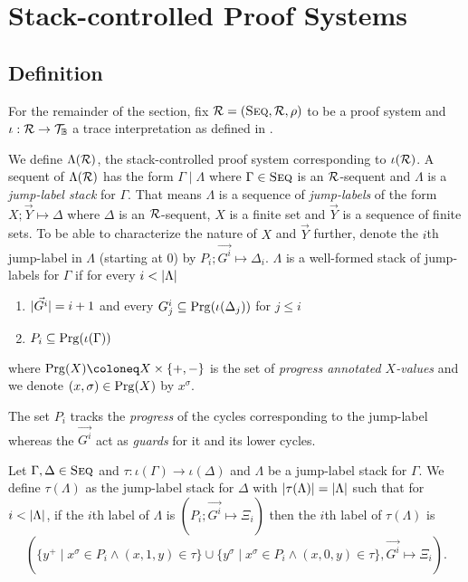 
\chapter{Stack-controlled Proof Systems}
\label{chap:stacks}

\section{Definition}
\label{sec:define-stacks}

For the remainder of the section, fix $\mathcal{R} = (\textsc{Seq}, \mathcal{R}, \rho)$ to be a proof
system and $\iota : \mathcal{R} \to \mathcal{T}_{\mathbb{B}}$ a trace interpretation as defined in
.

We define $\Lambda(\mathcal{R})$, the stack-controlled proof system corresponding to
$\iota(\mathcal{R})$. A sequent of $\Lambda(\mathcal{R})$ has the form $\Gamma \mid \Lambda$
where $\Gamma \in \textsc{Seq}$ is an $\mathcal{R}$-sequent and $\Lambda$ is a \emph{jump-label
  stack} for $\Gamma$. That means $\Lambda$ is a sequence of
\emph{jump-labels} of the form $X ; \vec{Y} \mapsto \Delta$ where $\Delta$ is an
$\mathcal{R}$-sequent, $X$ is a finite set and $\vec{Y}$ is a sequence of finite sets.
To be able to characterize the nature of $X$ and $\vec{Y}$ further, denote the
$i$th jump-label in $\Lambda$ (starting at $0$) by $P_i; \vec{G^i} \mapsto
\Delta_i$. $\Lambda$ is a well-formed stack of jump-labels for $\Gamma$ if for
every $i < |\Lambda|$
\begin{enumerate}[label=(\roman*)]
\item $|\vec{G^i}| = i + 1$ and every $G^i_j \subseteq
  \mathrm{Prg}(\iota(\Delta_j))$ for $j \leq i$
\item $P_i \subseteq \mathrm{Prg}(\iota(\Gamma))$
\end{enumerate}
where $\prg(X) \coloneq X \times \{+, -\}$ is the set of \emph{progress
  annotated $X$-values} and we denote $(x, \sigma) \in \mathrm{Prg}(X)$ by $x^\sigma$.

\begin{remark}
  The set $P_i$ tracks the \emph{progress} of the cycles corresponding to the
  jump-label whereas the $\vec{G^i}$ act as \emph{guards} for it and its lower cycles.
\end{remark}

Let $\Gamma, \Delta \in \textsc{Seq}$ and $\tau : \iota(\Gamma) \to \iota(\Delta)$ and
$\Lambda$ be a jump-label stack for $\Gamma$. We define $\tau(\Lambda)$ as the
jump-label stack for $\Delta$ with $|\tau(\Lambda)| = |\Lambda|$ such
that for $i < |\Lambda|$, if the $i$th label of $\Lambda$ is $(P_i;
\vec{G^i} \mapsto \Xi_i)$ then the $i$th label of $\tau(\Lambda)$ is
\[
  (\{y^+ \mid x^\sigma \in P_i \wedge (x, 1, y) \in \tau\} \cup \{y^\sigma \mid
  x^\sigma \in P_i \wedge (x, 0, y) \in \tau\}, \vec{G^i} \mapsto \Xi_i).
\]

